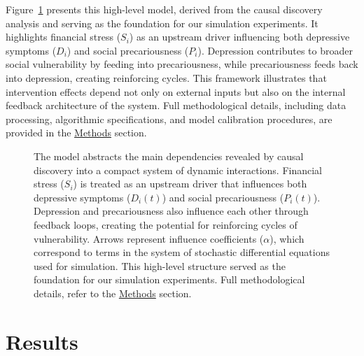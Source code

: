 \documentclass[
]{article}
\begin{document}
Figure~\ref{fig-concept} presents this high-level model, derived from
the causal discovery analysis and serving as the foundation for our
simulation experiments. It highlights financial stress (\(S_i\)) as an
upstream driver influencing both depressive symptoms (\(D_i\)) and
social precariousness (\(P_i\)). Depression contributes to broader
social vulnerability by feeding into precariousness, while
precariousness feeds back into depression, creating reinforcing cycles.
This framework illustrates that intervention effects depend not only on
external inputs but also on the internal feedback architecture of the
system. Full methodological details, including data processing,
algorithmic specifications, and model calibration procedures, are
provided in the \hyperref[sec-methods]{Methods} section.

\begin{figure}


\caption{\label{fig-concept}The model abstracts the main dependencies
revealed by causal discovery into a compact system of dynamic
interactions. Financial stress (\(S_i\)) is treated as an upstream
driver that influences both depressive symptoms (\(D_i(t)\)) and social
precariousness (\(P_i(t)\)). Depression and precariousness also
influence each other through feedback loops, creating the potential for
reinforcing cycles of vulnerability. Arrows represent influence
coefficients (\(\alpha\)), which correspond to terms in the system of
stochastic differential equations used for simulation. This high-level
structure served as the foundation for our simulation experiments. Full
methodological details, refer to the \hyperref[sec-methods]{Methods}
section.}

\end{figure}%

\section{Results}\label{results}
\end{document}
